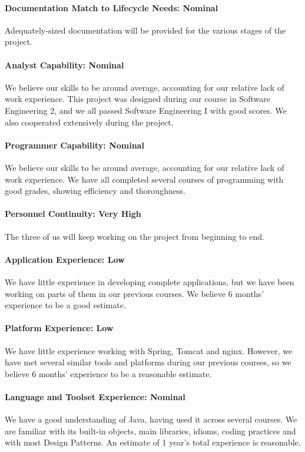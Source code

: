 \paragraph*{Documentation Match to Lifecycle Needs: Nominal}
Adequately-sized documentation will be provided for the various stages of the project.

\paragraph*{Analyst Capability: Nominal}
We believe our skills to be around average, accounting for our relative lack of work experience. This project was designed during our course in Software Engineering 2, and we all passed Software Engineering I with good scores. We also cooperated extensively during the project.

\paragraph*{Programmer Capability: Nominal}
We believe our skills to be around average, accounting for our relative lack of work experience. We have all completed several courses of programming with good grades, showing efficiency and thoroughness.	

\paragraph*{Personnel Continuity: Very High}
The three of us will keep working on the project from beginning to end.

\paragraph*{Application Experience: Low}
We have little experience in developing complete applications, but we have been working on parts of them in our previous courses. We believe 6 months' experience to be a good estimate.

\paragraph*{Platform Experience: Low}
We have little experience working with Spring, Tomcat and nginx. However, we have met several similar tools and platforms during our previous courses, so we believe 6 months' experience to be a reasonable estimate.

\paragraph*{Language and Toolset Experience: Nominal}
We have a good understanding of Java, having used it across several courses. We are familiar with its built-in objects, main libraries, idioms, coding practices and with most Design Patterns. An estimate of 1 year's total experience is reasonable.

